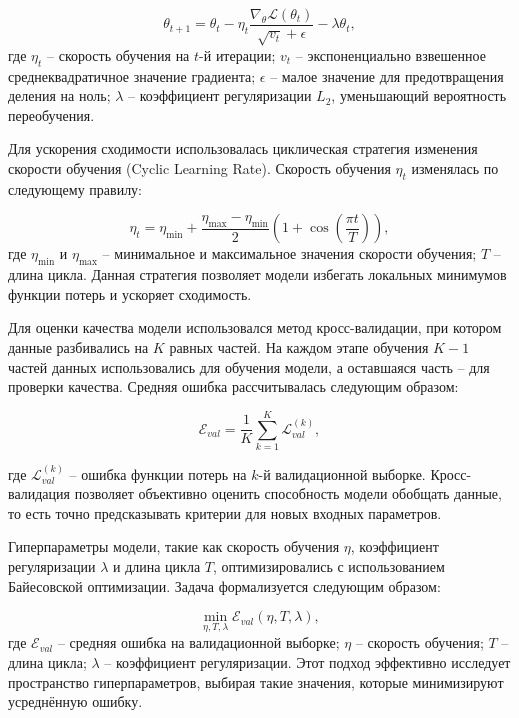 \begin{equation}
\theta_{t+1} = \theta_t - \eta_t \frac{\nabla_\theta \mathcal{L}(\theta_t)}{\sqrt{v_t} + \epsilon} - \lambda \theta_t,
\end{equation}
где $\eta_t$ -- скорость обучения на $t$-й итерации;
$v_t$ -- экспоненциально взвешенное среднеквадратичное значение градиента;
$\epsilon$ -- малое значение для предотвращения деления на ноль;
$\lambda$ -- коэффициент регуляризации $L_2$, уменьшающий вероятность переобучения.

Для ускорения сходимости использовалась циклическая стратегия изменения
скорости обучения (Cyclic Learning Rate). Скорость обучения $\eta_t$ изменялась по следующему правилу:

\begin{equation}
\eta_t = \eta_{\min} + \frac{\eta_{\max} - \eta_{\min}}{2} \left(1 + \cos\left(\frac{\pi t}{T}\right)\right),
\end{equation}
где $\eta_{\min}$ и $\eta_{\max}$ -- минимальное и максимальное значения скорости обучения;
$T$ -- длина цикла. Данная стратегия позволяет модели избегать локальных минимумов функции потерь и ускоряет сходимость.

Для оценки качества модели использовался метод кросс-валидации,
при котором данные разбивались на $K$ равных частей. На каждом этапе
обучения $K-1$ частей данных использовались для обучения модели,
а оставшаяся часть -- для проверки качества. Средняя ошибка рассчитывалась следующим образом:

\begin{equation}
\mathcal{E}_{val} = \frac{1}{K} \sum_{k=1}^K \mathcal{L}_{val}^{(k)},
\end{equation}

где $\mathcal{L}_{val}^{(k)}$ -- ошибка функции потерь на $k$-й валидационной выборке.
Кросс-валидация позволяет объективно оценить способность модели обобщать
данные, то есть точно предсказывать критерии для новых входных параметров.

Гиперпараметры модели, такие как скорость обучения $\eta$, коэффициент
регуляризации $\lambda$ и длина цикла $T$, оптимизировались с использованием
Байесовской оптимизации. Задача формализуется следующим образом:

\begin{equation}
    \label{eq:hyperopt}
\min_{\eta, T, \lambda} \mathcal{E}_{val}(\eta, T, \lambda),
\end{equation}
где $\mathcal{E}_{val}$ -- средняя ошибка на валидационной выборке;
$\eta$ -- скорость обучения; $T$ -- длина цикла; $\lambda$ -- коэффициент
регуляризации. Этот подход эффективно исследует пространство гиперпараметров,
выбирая такие значения, которые минимизируют усреднённую ошибку.




